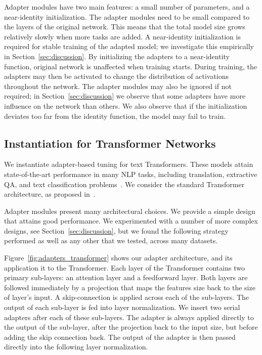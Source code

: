 Adapter modules have two main features: a small number of parameters, and a near-identity initialization.
The adapter modules need to be small compared to the layers of the original network.
This means that the total model size grows relatively slowly when more tasks are added.
A near-identity initialization is required for stable training of the adapted model;
we investigate this empirically in Section~\ref{sec:discussion}.
By initializing the adapters to a near-identity function, original network is unaffected when training starts.
During training, the adapters may then be activated to change the distribution of activations throughout the network.
The adapter modules may also be ignored if not required;
in Section~\ref{sec:discussion} we observe that some adapters have more influence on the network than others.
We also observe that if the initialization deviates too far from the identity function, the model may fail to train.

\subsection{Instantiation for Transformer Networks\label{sec:bottleneckadapter}}

We instantiate adapter-based tuning for text Transformers.
These models attain state-of-the-art performance in many NLP tasks,
including translation, extractive QA, and text classification problems~\citep{vaswani2017,radford2018improving,devlin2018bert}.
We consider the standard Transformer architecture, as proposed in~\citet{vaswani2017}.

Adapter modules present many architectural choices.
We provide a simple design that attains good performance.
We experimented with a number of more complex designs, see Section~\ref{sec:discussion},
but we found the following strategy performed as well as any other that we tested, across many datasets.

Figure~\ref{fig:adapters_transformer} shows our adapter architecture, and its application it to the Transformer.
Each layer of the Transformer contains two primary sub-layers: an attention layer and a feedforward layer.
Both layers are followed immediately by a projection that maps the features size back to the size of layer's input.
A skip-connection is applied across each of the sub-layers.
The output of each sub-layer is fed into layer normalization.
We insert two serial adapters after each of these sub-layers.
The adapter is always applied directly to the output of the sub-layer, after the projection back to the input size,
but before adding the skip connection back.
The output of the adapter is then passed directly into the following layer normalization.


